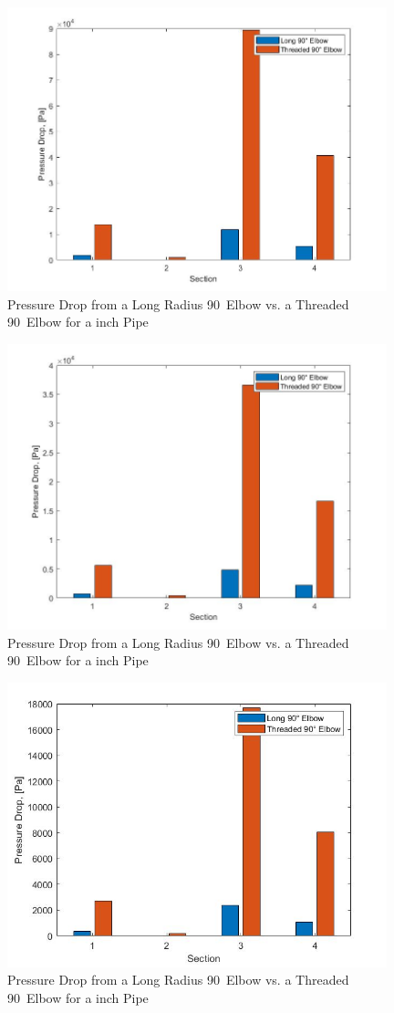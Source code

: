 \medskip
\begin{figure}[H]
    \centering
    \includegraphics[width=11cm]{images/1-4in_Elbow Pressure_Drop.jpg}
    \caption{Pressure Drop from a Long Radius 90\textdegree \ Elbow vs. a Threaded 90\textdegree \ Elbow for a  inch Pipe}
\end{figure}
\begin{figure}[H]
    \centering
    \includegraphics[width=11cm]{images/5-16in_Elbow Pressure_Drop.jpg}
    \caption{Pressure Drop from a Long Radius 90\textdegree \ Elbow vs. a Threaded 90\textdegree \ Elbow for a  inch Pipe}
\end{figure}
\begin{figure}[H]
    \centering
    \includegraphics[width=11cm]{images/3-8in_Elbow Pressure_Drop.jpg}
    \caption{Pressure Drop from a Long Radius 90\textdegree \ Elbow vs. a Threaded 90\textdegree \ Elbow for a  inch Pipe}
\end{figure}
